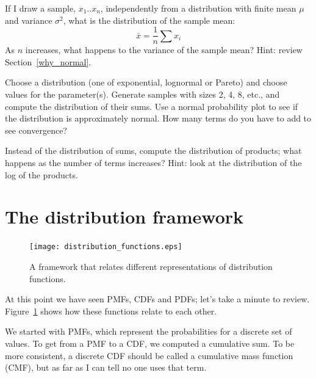 \documentclass[12pt]{book}
\begin{document}
\begin{ex}

\newcommand{\xbar}{\bar{x}}

If I draw a sample, $x_1 .. x_n$, independently from a
distribution with finite mean $\mu$ and variance $\sigma^2$, what is
the distribution of the sample mean:
%
\[ \xbar = \frac{1}{n} \sum x_i \]
%
As $n$ increases, what happens to the variance of the sample mean?
Hint: review Section~\ref{why_normal}.

\end{ex}

\begin{ex}

Choose a distribution (one of exponential, lognormal or Pareto) and
choose values for the parameter(s).  Generate samples with sizes
2, 4, 8, etc., and compute the distribution of their sums.  Use
a normal probability plot to see if the distribution is approximately
normal.  How many terms do you have to add to see convergence?

\end{ex}


\begin{ex}

Instead of the distribution of sums, compute the distribution of
products; what happens as the number of terms increases?
Hint: look at the distribution of the log of the products.

\end{ex}

\section{The distribution framework}

\begin{figure}
\centerline{\texttt{[image: distribution\_functions.eps]}}
\caption{A framework that relates different representations of distribution
functions.}
\label{dist_framework}
\end{figure}

At this point we have seen PMFs, CDFs and PDFs; let's take a minute
to review.  Figure~\ref{dist_framework} shows how these functions relate
to each other.

We started with PMFs, which represent the probabilities for a discrete
set of values.  To get from a PMF to a CDF, we computed a cumulative sum.
To be more consistent, a discrete CDF should be called a cumulative mass
function (CMF), but as far as I can tell no one uses that term.
\end{document}
